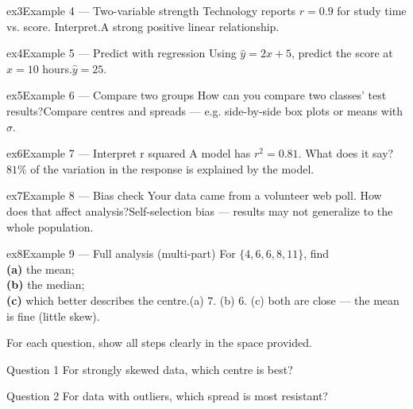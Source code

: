 \documentclass[11pt]{article}
\begin{document}
\begin{example}{ex3}{Example 4 --- Two-variable strength}
Technology reports $r=0.9$ for study time vs. score. Interpret.\soln A strong positive linear relationship.
\end{example}

\begin{example}{ex4}{Example 5 --- Predict with regression}
Using $\hat y=2x+5$, predict the score at $x=10$ hours.\soln $\hat y=25$.
\end{example}

\begin{example}{ex5}{Example 6 --- Compare two groups}
How can you compare two classes' test results?\soln Compare centres and spreads --- e.g. side-by-side box plots or means with $\sigma$.
\end{example}

\begin{example}{ex6}{Example 7 --- Interpret r squared}
A model has $r^{2}=0.81$. What does it say?\soln $81\%$ of the variation in the response is explained by the model.
\end{example}

\begin{example}{ex7}{Example 8 --- Bias check}
Your data came from a volunteer web poll. How does that affect analysis?\soln Self-selection bias --- results may not generalize to the whole population.
\end{example}

\begin{example}{ex8}{Example 9 --- Full analysis (multi-part)}
For $\{4,6,6,8,11\}$, find \\ \textbf{(a)} the mean; \\ \textbf{(b)} the median; \\ \textbf{(c)} which better describes the centre.\soln (a) $7$. (b) $6$. (c) both are close --- the mean is fine (little skew).
\end{example}

\clearpage
{}
For each question, show all steps clearly in the space provided.

\begin{qbox}{Question 1}
For strongly skewed data, which centre is best?\workspace{2.4cm}
\end{qbox}

\begin{qbox}{Question 2}
For data with outliers, which spread is most resistant?\workspace{2.4cm}
\end{qbox}
\end{document}
